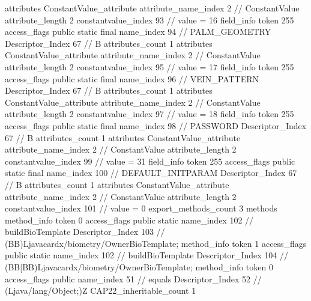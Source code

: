 {{{{{				attributes {
				ConstantValue_attribute {
					attribute_name_index	2		// ConstantValue
					attribute_length	2
					constantvalue_index	93		// value = 16
				}
				}
			}
			field_info {
				token	255
				access_flags	public static final
				name_index	94		// PALM_GEOMETRY
				Descriptor_Index	67		// B
				attributes_count	1
				attributes {
				ConstantValue_attribute {
					attribute_name_index	2		// ConstantValue
					attribute_length	2
					constantvalue_index	95		// value = 17
				}
				}
			}
			field_info {
				token	255
				access_flags	public static final
				name_index	96		// VEIN_PATTERN
				Descriptor_Index	67		// B
				attributes_count	1
				attributes {
				ConstantValue_attribute {
					attribute_name_index	2		// ConstantValue
					attribute_length	2
					constantvalue_index	97		// value = 18
				}
				}
			}
			field_info {
				token	255
				access_flags	public static final
				name_index	98		// PASSWORD
				Descriptor_Index	67		// B
				attributes_count	1
				attributes {
				ConstantValue_attribute {
					attribute_name_index	2		// ConstantValue
					attribute_length	2
					constantvalue_index	99		// value = 31
				}
				}
			}
			field_info {
				token	255
				access_flags	public static final
				name_index	100		// DEFAULT_INITPARAM
				Descriptor_Index	67		// B
				attributes_count	1
				attributes {
				ConstantValue_attribute {
					attribute_name_index	2		// ConstantValue
					attribute_length	2
					constantvalue_index	101		// value = 0
				}
				}
			}
			}
			export_methods_count	3
			methods {
				method_info {
					token	0
					access_flags	public static
					name_index	102		// buildBioTemplate
					Descriptor_Index	103		// (BB)Ljavacardx/biometry/OwnerBioTemplate;
				}
				method_info {
					token	1
					access_flags	public static
					name_index	102		// buildBioTemplate
					Descriptor_Index	104		// (BB[BB)Ljavacardx/biometry/OwnerBioTemplate;
				}
				method_info {
					token	0
					access_flags	public
					name_index	51		// equals
					Descriptor_Index	52		// (Ljava/lang/Object;)Z
				}
			}
			CAP22_inheritable_count	1
		}
	}
}
